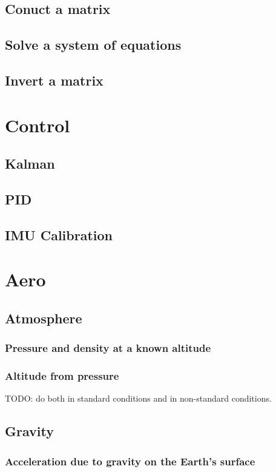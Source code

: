 \documentclass[10pt,letterpaper]{memoir} %
\begin{document}
\section{Conuct a matrix}
\section{Solve a system of equations}
\section{Invert a matrix}

\chapter{Control}
\section{Kalman}
\section{PID}
\section{IMU Calibration}

\chapter{Aero}
\section{Atmosphere}
\subsection{Pressure and density at a known altitude}
\subsection{Altitude from pressure}
TODO: do both in standard conditions and in non-standard conditions.

\section{Gravity}
\subsection{Acceleration due to gravity on the Earth's surface}
\end{document}
